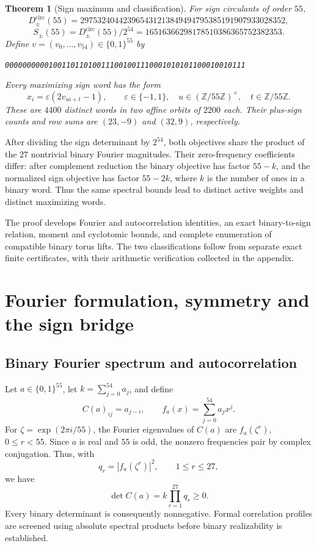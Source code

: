 \documentclass[11pt,a4paper]{article}
\newtheorem{theorem}{Theorem}
\theoremstyle{remark}
\newcommand{\Z}{\mathbb Z}
\begin{document}
\begin{theorem}[Sign maximum and classification]\label{thm:sign}
For sign circulants of order $55$,
\[
 D_{\pm}^{\mathrm{circ}}(55)=
 297532404423965431213849494795385191907933028352,
\]
\[
 S_{\pm}(55)=D_{\pm}^{\mathrm{circ}}(55)/2^{54}
 =16516366298178510386365752382353.
\]
Define $v=(v_0,\ldots,v_{54})\in\{0,1\}^{55}$ by
\begin{center}
\texttt{0000000000100110110100111001001110001010101100010010111}
\end{center}
Every maximizing sign word has the form
\[
  x_i=\varepsilon(2v_{ui+t}-1),\qquad
  \varepsilon\in\{-1,1\},\quad
  u\in(\Z/55\Z)^\times,\quad
  t\in\Z/55\Z.
\]
These are $4400$ distinct words in two affine orbits of $2200$
each.  Their plus-sign counts and row sums are $(23,-9)$ and
$(32,9)$, respectively.
\end{theorem}

After dividing the sign determinant by $2^{54}$,
both objectives share the product of the $27$ nontrivial
binary Fourier magnitudes. Their zero-frequency coefficients
differ: after complement reduction the binary objective has factor
$55-k$, and the normalized sign objective has factor $55-2k$,
where $k$ is the number of ones in a binary word.  Thus the
same spectral bounds lead to distinct active weights and distinct
maximizing words.

The proof develops Fourier and autocorrelation identities, an
exact binary-to-sign relation, moment and cyclotomic bounds, and
complete enumeration of compatible binary torus lifts.
The two classifications follow from separate exact finite
certificates, with their arithmetic verification collected in the
appendix.

\section{Fourier formulation, symmetry and the sign bridge}

\subsection{Binary Fourier spectrum and autocorrelation}


Let $a\in\{0,1\}^{55}$, let $k=\sum_{j=0}^{54}a_j$, and define
\[
  C(a)_{ij}=a_{j-i},
  \qquad
  f_a(x)=\sum_{j=0}^{54}a_jx^j.
\]
For $\zeta=\exp(2\pi i/55)$, the Fourier eigenvalues of
$C(a)$ are $f_a(\zeta^r)$, $0\leq r<55$.  Since $a$ is real and $55$ is odd, the nonzero frequencies
pair by complex conjugation.  Thus, with
\[
  q_r=|f_a(\zeta^r)|^2,\qquad 1\leq r\leq27,
\]
we have
\begin{equation}
\label{eq:fourier-det}
  \det C(a)=k\prod_{r=1}^{27}q_r\geq0.
\end{equation}
Every binary determinant is consequently nonnegative.  Formal
correlation profiles are screened using absolute spectral products
before binary realizability is established.
\end{document}

